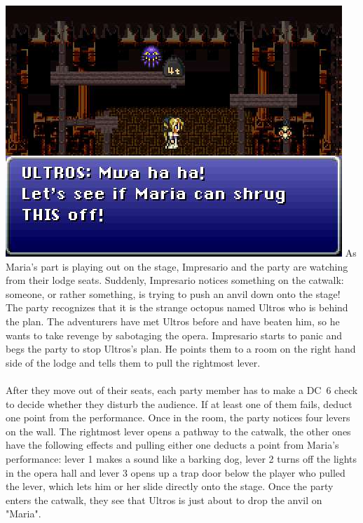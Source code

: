 \includegraphics[width=\columnwidth]{./art/mariaanddraco/ultros.jpg}
%
\vfill
%
As Maria's part is playing out on the stage, Impresario and the party are watching from their lodge seats.
Suddenly, Impresario notices something on the catwalk: someone, or rather something, is trying to push an anvil down onto the stage!
The party recognizes that it is the strange octopus named Ultros who is behind the plan.
The adventurers have met Ultros before and have beaten him, so he wants to take revenge by sabotaging the opera. 
Impresario starts to panic and begs the party to stop Ultros's plan.
He points them to a room on the right hand side of the lodge and tells them to pull the rightmost lever.
%
\newpage
%
\\\\
%
After they move out of their seats, each party member has to make a DC~6 check to decide whether they disturb the audience.
If at least one of them fails, deduct one point from the performance.
Once in the room, the party notices four levers on the wall.
The rightmost lever opens a pathway to the catwalk, the other ones have the following effects and pulling either one deducts a point from Maria's performance: lever 1 makes a sound like a barking dog, lever 2 turns off the lights in the opera hall and lever 3 opens up a trap door below the player who pulled the lever, which lets him or her slide directly onto the stage. 
Once the party enters the catwalk, they see that Ultros is just about to drop the anvil on "Maria".
